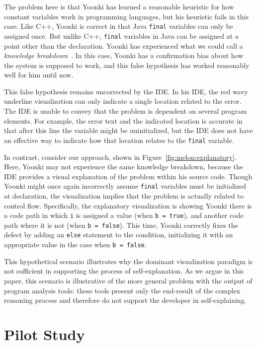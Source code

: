 \documentclass[conference]{IEEEtran}
\begin{document}
The problem here is that Yoonki has learned a reasonable heuristic for how constant variables work in programming languages, but his heuristic fails in this case. Like C++, Yoonki is correct in that Java \texttt{final} variables can only be assigned once. But unlike C++, \texttt{final} variables in Java can be assigned at a point other than the declaration. Yoonki has experienced what we could call a \textit{knowledge breakdown}~\cite{Ko2005}. In this case, Yoonki has a confirmation bias about how the system is supposed to work, and this false hypothesis has worked reasonably well for him until now.

This false hypothesis remains uncorrected by the IDE. In his IDE, the red wavy underline visualization can only indicate a single location related to the error. The IDE is unable to convey that the problem is dependent on several program elements. For example, the error text and the indicated location is accurate in that after this line the variable might be uninitialized, but the IDE does not have an effective way to indicate how that location relates to the \texttt{final} variable.

In contrast, consider our approach, shown in Figure~\ref{fig:melon:explanatory}. Here, Yoonki may not experience the same knowledge breakdown, because the IDE provides a visual explanation of the problem within his source code. Though Yoonki might once again incorrectly assume \texttt{final} variables must be initialized at declaration, the visualization implies that the problem is actually related to control flow. Specifically, the explanatory visualization is showing Yoonki there is a code path in which \texttt{i} is assigned a value (when \texttt{b = true}), and another code path where it is not (when \texttt{b = false}). This time, Yoonki correctly fixes the defect by adding an \texttt{else} statement to the condition, initializing it with an appropriate value in the case when \texttt{b = false}.

This hypothetical scenario illustrates why the dominant visualization paradigm is not sufficient in supporting the process of self-explanation. As we argue in this paper, this scenario is illustrative of the more general problem with the output of program analysis tools: these tools present only the end-result of the complex reasoning process and therefore do not support the developer in self-explaining.

\section{Pilot Study}
\label{sec:pilotstudy}
\end{document}
